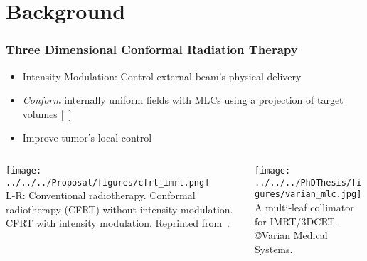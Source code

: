 \section{Background}
%	
%	

\begin{frame}
	\frametitle{Three Dimensional Conformal Radiation Therapy}
	\begin{itemize}
		\tiny \item Intensity Modulation: Control external beam's physical delivery
		\tiny \item \textit{Conform} internally uniform fields with MLCs using a projection of target volumes [~\cite{boyer1992clinical}]
		\tiny \item Improve tumor's local control
	\end{itemize}
%
	\begin{columns}[c]
		\begin{column}{.55\textwidth}	
			\centering		
			\texttt{[image: ../../../Proposal/figures/cfrt\_imrt.png]}\\			
			\tiny L-R: Conventional radiotherapy. Conformal radiotherapy (CFRT) without intensity modulation.  CFRT with intensity modulation. Reprinted from~\cite{WebbIMRT}.
		\end{column}
	\begin{column}{.48\textwidth}
		\texttt{[image: ../../../PhDThesis/figures/varian\_mlc.jpg]} \\
		\centering \tiny{A multi-leaf collimator for IMRT/3DCRT. \copyright Varian Medical Systems.}
		\label{fig:mlc_varian}
	\end{column}
	\end{columns}
\end{frame}


